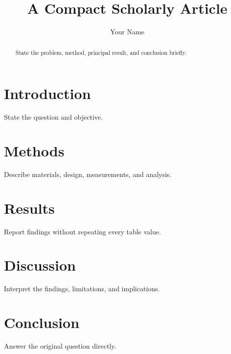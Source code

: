 \documentclass{article}
\title{A Compact Scholarly Article}
\author{Your Name}
\date{}
\begin{document}
\maketitle

\begin{abstract}
State the problem, method, principal result, and conclusion briefly.
\end{abstract}

\section{Introduction}
State the question and objective.

\section{Methods}
Describe materials, design, measurements, and analysis.

\section{Results}
Report findings without repeating every table value.

\section{Discussion}
Interpret the findings, limitations, and implications.

\section{Conclusion}
Answer the original question directly.
\end{document}
